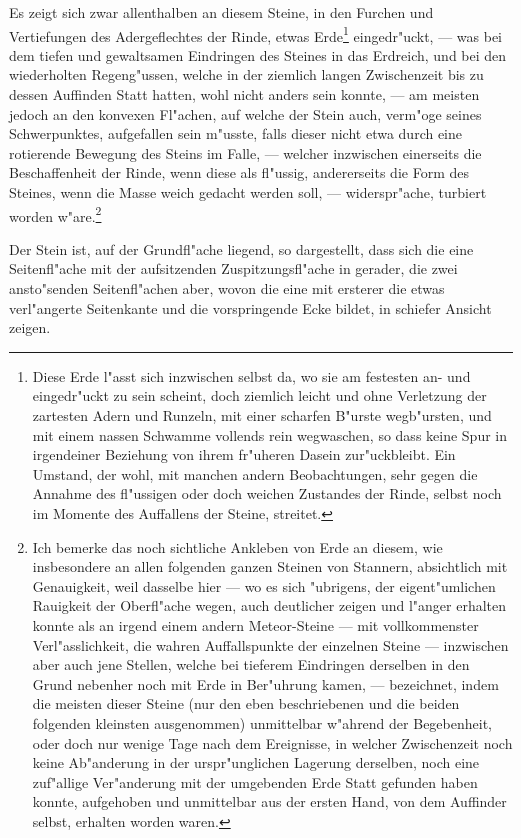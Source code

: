 \documentclass[a4paper, 11pt, oneside, german]{article}
\begin{document}
Es zeigt sich zwar allenthalben an diesem Steine, in den Furchen und Vertiefungen des Adergeflechtes der Rinde, etwas Erde\footnote{Diese Erde l"asst sich inzwischen selbst da, wo sie am festesten an- und eingedr"uckt zu sein scheint, doch ziemlich leicht und ohne Verletzung der zartesten Adern und Runzeln, mit einer scharfen B"urste wegb"ursten, und mit einem nassen Schwamme vollends rein wegwaschen, so dass keine Spur in irgendeiner Beziehung von ihrem fr"uheren Dasein zur"uckbleibt. Ein Umstand, der wohl, mit manchen andern Beobachtungen, sehr gegen die Annahme des fl"ussigen oder doch weichen Zustandes der Rinde, selbst noch im Momente des Auffallens der Steine, streitet.} eingedr"uckt, --- was bei dem tiefen und gewaltsamen Eindringen des Steines in das Erdreich, und bei den wiederholten Regeng"ussen, welche in der ziemlich langen Zwischenzeit bis zu dessen Auffinden Statt hatten, wohl nicht anders sein konnte, --- am meisten jedoch an den konvexen Fl"achen, auf welche der Stein auch, verm"oge seines Schwerpunktes, aufgefallen sein m"usste, falls dieser nicht etwa durch eine rotierende Bewegung des Steins im Falle, --- welcher inzwischen einerseits die Beschaffenheit der Rinde, wenn diese als fl"ussig, andererseits die Form des Steines, wenn die Masse weich gedacht werden soll, --- widerspr"ache, turbiert worden w"are.\footnote{Ich bemerke das noch sichtliche Ankleben von Erde an diesem, wie insbesondere an allen folgenden ganzen Steinen von Stannern, absichtlich mit Genauigkeit, weil dasselbe hier --- wo es sich "ubrigens, der eigent"umlichen Rauigkeit der Oberfl"ache wegen, auch deutlicher zeigen und l"anger erhalten konnte als an irgend einem andern Meteor-Steine --- mit vollkommenster Verl"asslichkeit, die wahren Auffallspunkte der einzelnen Steine --- inzwischen aber auch jene Stellen, welche bei tieferem Eindringen derselben in den Grund nebenher noch mit Erde in Ber"uhrung kamen, --- bezeichnet, indem die meisten dieser Steine (nur den eben beschriebenen und die beiden folgenden kleinsten ausgenommen) unmittelbar w"ahrend der Begebenheit, oder doch nur wenige Tage nach dem Ereignisse, in welcher Zwischenzeit noch keine Ab"anderung in der urspr"unglichen Lagerung derselben, noch eine zuf"allige Ver"anderung mit der umgebenden Erde Statt gefunden haben konnte, aufgehoben und unmittelbar aus der ersten Hand, von dem Auffinder selbst, erhalten worden waren.}

Der Stein ist, auf der Grundfl"ache liegend, so dargestellt, dass sich die eine Seitenfl"ache mit der aufsitzenden Zuspitzungsfl"ache in gerader, die zwei ansto"senden Seitenfl"achen aber, wovon die eine mit ersterer die etwas verl"angerte Seitenkante und die vorspringende Ecke bildet, in schiefer Ansicht zeigen.
\clearpage
\end{document}
